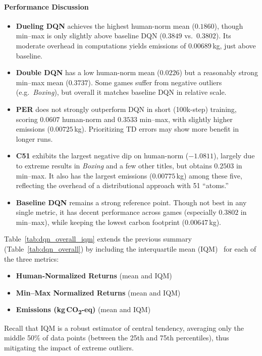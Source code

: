 \paragraph{Performance Discussion}
\begin{itemize}
	\item \textbf{Dueling DQN} achieves the highest human-norm mean ($0.1860$), 
	though min--max is only slightly above baseline DQN ($0.3849$ vs.\ $0.3802$). 
	Its moderate overhead in computations yields emissions of $0.00689$\,kg, 
	just above baseline.
	\item \textbf{Double DQN} has a low human-norm mean ($0.0226$) but a reasonably strong min--max mean ($0.3737$). 
	Some games suffer from negative outliers (e.g.\ \emph{Boxing}), 
	but overall it matches baseline DQN in relative scale.
	\item \textbf{PER} does not strongly outperform DQN in short (100k-step) training, 
	scoring $0.0607$ human-norm and $0.3533$ min--max, 
	with slightly higher emissions ($0.00725$\,kg). 
	Prioritizing TD errors may show more benefit in longer runs.
	\item \textbf{C51} exhibits the largest negative dip on human-norm ($-1.0811$), 
	largely due to extreme results in \emph{Boxing} and a few other titles, 
	but obtains $0.2503$ in min--max. 
	It also has the largest emissions ($0.00775$\,kg) among these five, 
	reflecting the overhead of a distributional approach with 51 “atoms.”
	\item \textbf{Baseline DQN} remains a strong reference point. 
	Though not best in any single metric, it has decent performance across games (especially $0.3802$ in min--max), 
	while keeping the lowest carbon footprint ($0.00647$\,kg). 
\end{itemize}

Table~\ref{tab:dqn_overall_iqm} extends the previous summary
(Table~\ref{tab:dqn_overall})
by including the interquartile mean (IQM)~\cite{agarwal:statistical_precipice}
for each of the three metrics:
\begin{itemize}
	\item \textbf{Human‐Normalized Returns} (mean and IQM)
	\item \textbf{Min--Max Normalized Returns} (mean and IQM)
	\item \textbf{Emissions (kg\,CO\textsubscript{2}-eq)} (mean and IQM)
\end{itemize}
Recall that IQM is a robust estimator of central tendency, 
averaging only the middle 50\% of data points (between the 25th and 75th percentiles),
thus mitigating the impact of extreme outliers.

